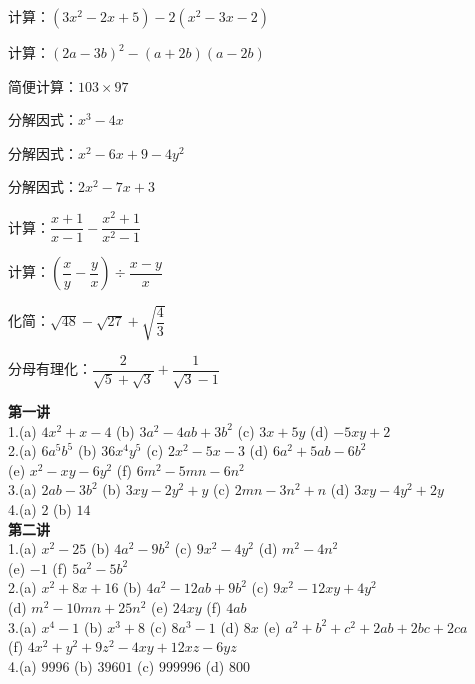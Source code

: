 \documentclass[a4paper,12pt]{ctexart}
\begin{document}
\newpage


\begin{exercise}
\item 计算：$(3x^2-2x+5)-2(x^2-3x-2)$
\item 计算：$(2a-3b)^2-(a+2b)(a-2b)$
\item 简便计算：$103\times97$
\item 分解因式：$x^3-4x$
\item 分解因式：$x^2-6x+9-4y^2$
\item 分解因式：$2x^2-7x+3$
\item 计算：$\dfrac{x+1}{x-1}-\dfrac{x^2+1}{x^2-1}$
\item 计算：$\left(\dfrac{x}{y}-\dfrac{y}{x}\right)\div\dfrac{x-y}{x}$
\item 化简：$\sqrt{48}-\sqrt{27}+\sqrt{\dfrac{4}{3}}$
\item 分母有理化：$\dfrac{2}{\sqrt5+\sqrt3}+\dfrac{1}{\sqrt3-1}$
\end{exercise}

\newpage


\textbf{第一讲}
\noindent\\
1.(a) $4x^2+x-4$ \quad (b) $3a^2-4ab+3b^2$ \quad (c) $3x+5y$ \quad (d) $-5xy+2$\\
2.(a) $6a^5b^5$ \quad (b) $36x^4y^5$ \quad (c) $2x^2-5x-3$ \quad (d) $6a^2+5ab-6b^2$\\
(e) $x^2-xy-6y^2$ \quad (f) $6m^2-5mn-6n^2$\\
3.(a) $2ab-3b^2$ \quad (b) $3xy-2y^2+y$ \quad (c) $2mn-3n^2+n$ \quad (d) $3xy-4y^2+2y$\\
4.(a) $2$ \quad (b) $14$\\

\textbf{第二讲}
\noindent\\
1.(a) $x^2-25$ \quad (b) $4a^2-9b^2$ \quad (c) $9x^2-4y^2$ \quad (d) $m^2-4n^2$\\
(e) $-1$ \quad (f) $5a^2-5b^2$\\
2.(a) $x^2+8x+16$ \quad (b) $4a^2-12ab+9b^2$ \quad (c) $9x^2-12xy+4y^2$\\
(d) $m^2-10mn+25n^2$ \quad (e) $24xy$ \quad (f) $4ab$\\
3.(a) $x^4-1$ \quad (b) $x^3+8$ \quad (c) $8a^3-1$ \quad (d) $8x$ \quad (e) $a^2+b^2+c^2+2ab+2bc+2ca$\\
(f) $4x^2+y^2+9z^2-4xy+12xz-6yz$\\
4.(a) $9996$ \quad (b) $39601$ \quad (c) $999996$ \quad (d) $800$\\
\end{document}
